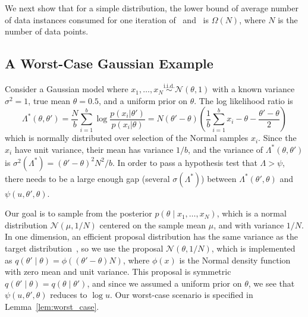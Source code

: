 \documentclass{article}
\newcommand{\simiid}{\overset{\textrm{i.i.d.}}{\sim}}
\begin{document}
We next show that for a simple distribution, the lower bound of average
number of data instances consumed for one iteration of~\cite{cutting_mh_2014}
and~\cite{icml2014c1_bardenet14} is $\Omega(N)$, where $N$ is the number of data
points.

\subsection{A Worst-Case Gaussian Example}\label{ssec:gaussian_example}
Consider a Gaussian model where $x_1,\ldots,x_N \simiid \mathcal{N}(\theta,1)$
with a known variance $\sigma^2=1$, true mean $\theta=0.5$, and a uniform prior
on $\theta$. The log likelihood ratio is
\begin{equation}
\Lambda^*(\theta,\theta') =  \frac{N}{b}\sum_{i=1}^b \log\frac{p(x_i|\theta')}{p(x_i|\theta)}=
  N(\theta'-\theta)\left(\frac{1}{b}\sum_{i=1}^b x_i-\theta-\frac{\theta'-\theta}{2}\right)
\end{equation}
which is normally distributed over selection of the Normal samples $x_i$.  Since
the $x_i$ have unit variance, their mean has variance $1/b$, and the variance of
$\Lambda^*(\theta,\theta')$ is $\sigma^2(\Lambda^*) = (\theta'-\theta)^2N^2/b$.
In order to pass a hypothesis test that $\Lambda > \psi$, there needs to be a
large enough gap (several $\sigma(\Lambda^*)$) between
$\Lambda^*(\theta',\theta)$ and $\psi(u,\theta',\theta)$. 

Our goal is to sample from the posterior $p(\theta \mid x_1,\ldots,x_N)$, which
is a normal distribution $\mathcal{N}(\mu, 1/N)$ centered on the sample mean
$\mu$, and with variance $1/N$. In one dimension, an efficient proposal
distribution has the same variance as the target
distribution~\cite{OptimalScaling01}, so we use the proposal
$\mathcal{N}(\theta,1/N)$, which is implemented as
$q(\theta'\mid\theta)=\phi((\theta'-\theta)N)$, where $\phi(x)$ is the Normal
density function with zero mean and unit variance. This proposal is symmetric
$q(\theta'\mid\theta)=q(\theta\mid\theta')$, and since we assumed a uniform
prior on $\theta$, we see that $\psi(u,\theta',\theta)$ reduces to $\log u$. Our
worst-case scenario is specified in Lemma~\ref{lem:worst_case}.
\end{document}
